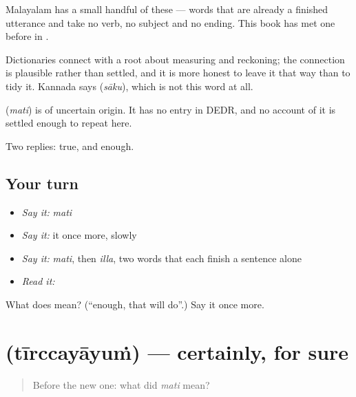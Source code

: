 Malayalam has a small handful of these — words that are already a finished utterance and take no verb, no subject and no ending. This book has met one before in .

Dictionaries connect  with a root about measuring and reckoning; the connection is plausible rather than settled, and it is more honest to leave it that way than to tidy it. Kannada says  (\emph{sāku}), which is not this word at all.

\begin{cousinweb}
\textbf{} (\emph{mati}) is of uncertain origin. It has no entry in DEDR, and no account of it is settled enough to repeat here.
\end{cousinweb}

\begin{grammarlens}[title={What you've built}]
Two replies: true, and enough.
\end{grammarlens}

\subsection*{Your turn}
\begin{itemize}
\raggedright
  \item \emph{Say it:} \emph{mati}
  \item \emph{Say it:} it once more, slowly
  \item \emph{Say it:} \emph{mati}, then \emph{illa}, two words that each finish a sentence alone
  \item \emph{Read it:} \textbf{}
\end{itemize}

\begin{tcolorbox}[breakable,colback=teal!4,colframe=teal!35!black,title={Before you move on}]
What does  mean? (\textquotedblleft{}enough, that will do\textquotedblright{}.) Say it once more.
\end{tcolorbox}
\section[\texorpdfstring{\ml{തീർച്ചയായും} (tīrccayāyuṁ)}{തീർച്ചയായും (tīrccayāyuṁ)}]{ (tīrccayāyuṁ) — certainly, for sure}

\label{lesson:ML-C49-certainly}



\begin{quote}
Before the new one: what did \emph{mati} mean?
\end{quote}

